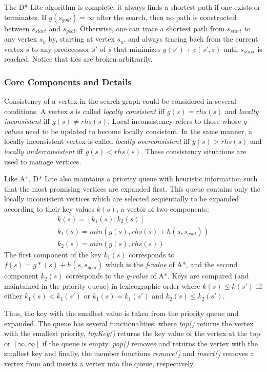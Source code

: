 \documentclass[10pt,journal]{IEEEtran}
\begin{document}
The D* Lite algorithm is complete; it always finds a shortest path if one exists or terminates. If $g(s_{goal}) = \infty$ after the search, then no path is constructed between $s_{start}$ and $s_{goal}$. Otherwise, one can trace a shortest path from $s_{start}$ to any vertex $s_{u}$ by, starting at vertex $s_{u}$, and always tracing back from the current vertex $s$ to any predecessor $s'$ of $s$ that minimizes $g(s') + c(s', s)$ until $s_{start}$ is reached. Notice that ties are broken arbitrarily.

\subsubsection{Core Components and Details}

Consistency of a vertex in the search graph could be considered in several conditions. A vertex $s$ is called \textit{locally consistent} iff $g(s) = rhs(s)$ and \textit{locally inconsistent} iff $g(s) \neq rhs(s)$. Local inconsistency refers to those whose \textit{g-values} need to be updated to become locally consistent. In the same manner, a locally inconsistent vertex is called \textit{locally overconsistent} iff $g(s) > rhs(s)$ and \textit{locally underconsistent} iff $g(s) < rhs(s)$. These consistency situations are used to manage vertices.

Like A*, D* Lite also maintains a priority queue with heuristic information such that the most promising vertices are expanded first. This queue contains only the locally inconsistent vertices which are selected sequentially to be expanded according to their key values $k(s)$, a vector of two components:
\begin{gather*}
k(s) = [k_{1}(s); k_{2}(s)] \\
k_{1}(s) = min(g(s), rhs(s) + h(s, s_{goal})) \\
k_{2}(s) = min(g(s), rhs(s))
\end{gather*}
The first component of the key $k_{1}(s)$ corresponds to $f(s) = g*(s) + h(s, s_{goal})$ which is the \textit{f-value} of A*, and the second component $k_{2}(s)$ corresponds to the \textit{g-value} of A*. Keys are compared (and maintained in the priority queue) in lexicographic order where $k(s) \leq k(s')$ iff either $k_{1}(s) < k_{1}(s')$ or $k_{1}(s) = k_{1}(s')$ and $k_{2}(s) \leq k_{2}(s')$.

Thus, the key with the smallest value is taken from the priority queue and expanded. The queue has several functionalities; where \textit{top()} returns the vertex with the smallest priority, \textit{topKey()} returns the key value of the vertex at the top or $[\infty, \infty]$ if the queue is empty. \textit{pop()} removes and returns the vertex with the smallest key and finally, the member functions \textit{remove()} and \textit{insert()} removes a vertex from and inserts a vertex into the queue, respectively.
\end{document}
